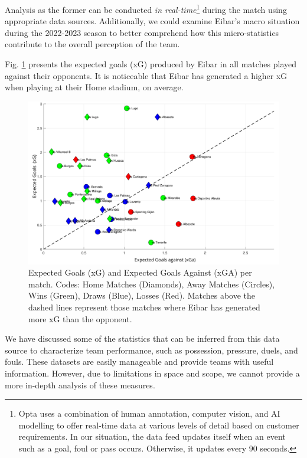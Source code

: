 \documentclass[
  10pt,
  twoside,nohyper]{book}
\begin{document}
Analysis as the former can be conducted \emph{in real-time}\footnote{Opta \autocite{opta} uses a combination of human annotation, computer vision, and AI modelling to offer real-time data at various levels of detail based on customer requirements. In our situation, the data feed updates itself when an event such as a goal, foul or pass occurs. Otherwise, it updates every 90 seconds.} during the
match using appropriate data sources. Additionally, we could examine
Eibar's macro situation during the 2022-2023 season to better comprehend
how this micro-statistics contribute to the overall perception of the
team.

Fig. \ref{fig:xg-xga} presents the expected goals (xG) produced by Eibar in all matches played against their opponents. It is noticeable that Eibar has generated a higher xG when playing at their Home stadium, on average.

\begin{figure}[H]

{\centering \includegraphics[width=0.8\linewidth,]{imagenes/scat-xG-xGa} 

}

\caption{Expected Goals (xG) and Expected Goals Against (xGA) per match. Codes: Home Matches (Diamonds), Away Matches (Circles), Wins (Green), Draws (Blue), Losses (Red). Matches above the dashed lines represent those matches where Eibar has generated more xG than the opponent.}\label{fig:xg-xga}
\end{figure}

We have discussed some of the statistics that can be inferred from this data source to characterize team performance, such as possession, pressure, duels, and fouls. These datasets are easily manageable and provide teams with useful information. However, due to limitations in space and scope, we cannot provide a more in-depth analysis of these measures.
\end{document}
